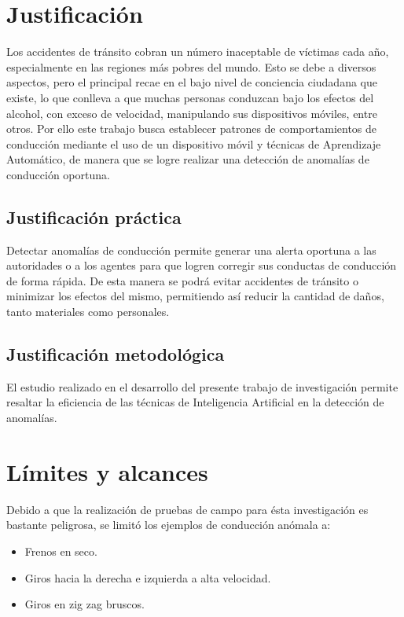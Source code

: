 \section{Justificación}

Los accidentes de tránsito cobran un número inaceptable de víctimas cada a\~{n}o, especialmente en las regiones m\'{a}s pobres del mundo. Esto se debe a diversos aspectos, pero el principal recae en el bajo nivel de conciencia ciudadana que existe, lo que conlleva a que muchas personas conduzcan bajo los efectos del alcohol, con exceso de velocidad, manipulando sus dispositivos m\'{o}viles, entre otros. Por ello este trabajo busca establecer patrones de comportamientos de conducci\'{o}n mediante el uso de un dispositivo m\'{o}vil y t\'{e}cnicas de Aprendizaje Autom\'{a}tico, de manera que se logre realizar una detecci\'{o}n de anomal\'{i}as de conducci\'{o}n oportuna.

\subsection{Justificaci\'{o}n pr\'{a}ctica}

Detectar anomal\'{i}as de conducci\'{o}n permite generar una alerta oportuna a las autoridades o a los agentes para que logren corregir sus conductas de conducci\'{o}n de forma r\'{a}pida. De esta manera se podr\'{a} evitar accidentes de tr\'{a}nsito o minimizar los efectos del mismo, permitiendo as\'{i} reducir la cantidad de da\~{n}os, tanto materiales como personales.

\subsection{Justificaci\'{o}n metodol\'{o}gica}

El estudio realizado en el desarrollo del presente trabajo de investigaci\'{o}n permite resaltar la eficiencia de las t\'{e}cnicas de Inteligencia Artificial en la detecci\'{o}n de anomal\'{i}as.

\section{L\'{i}mites y alcances}

Debido a que la realizaci\'{o}n de pruebas de campo para \'{e}sta investigaci\'{o}n es bastante peligrosa, se limit\'{o} los ejemplos de conducci\'{o}n an\'{o}mala a:

\begin{itemize}
\item Frenos en seco.
\item Giros hacia la derecha e izquierda a alta velocidad.
\item Giros en zig zag bruscos.
\end{itemize}

